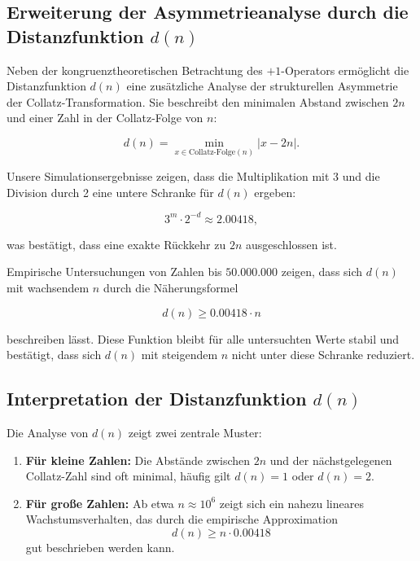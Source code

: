 \documentclass[a4paper,12pt]{article}
\begin{document}
\subsection{Erweiterung der Asymmetrieanalyse durch die Distanzfunktion \( d(n) \)}

Neben der kongruenztheoretischen Betrachtung des \(+1\)-Operators ermöglicht die Distanzfunktion \( d(n) \) eine zusätzliche Analyse der strukturellen Asymmetrie der Collatz-Transformation. Sie beschreibt den minimalen Abstand zwischen \( 2n \) und einer Zahl in der Collatz-Folge von \( n \):

\begin{equation}
    d(n) = \min_{x \in \text{Collatz-Folge}(n)} |x - 2n|.
\end{equation}

Unsere Simulationsergebnisse zeigen, dass die Multiplikation mit 3 und die Division durch 2 eine untere Schranke für \( d(n) \) ergeben:

\begin{equation}
    3^m \cdot 2^{-d} \approx 2.00418,
\end{equation}

was bestätigt, dass eine exakte Rückkehr zu \( 2n \) ausgeschlossen ist.

Empirische Untersuchungen von Zahlen bis \( 50.000.000 \) zeigen, dass sich \( d(n) \) mit wachsendem \( n \) durch die Näherungsformel

\begin{equation}
    d(n) \geq 0.00418 \cdot n
\end{equation}

beschreiben lässt. Diese Funktion bleibt für alle untersuchten Werte stabil und bestätigt, dass sich \( d(n) \) mit steigendem \( n \) nicht unter diese Schranke reduziert.



\subsection{Interpretation der Distanzfunktion \( d(n) \)}

Die Analyse von \( d(n) \) zeigt zwei zentrale Muster:

\begin{enumerate}
    \item \textbf{Für kleine Zahlen:} Die Abstände zwischen \( 2n \) und der nächstgelegenen Collatz-Zahl sind oft minimal, häufig gilt \( d(n) = 1 \) oder \( d(n) = 2 \).
    \item \textbf{Für große Zahlen:} Ab etwa \( n \approx 10^6 \) zeigt sich ein nahezu lineares Wachstumsverhalten, das durch die empirische Approximation 
    \[
    d(n) \geq n \cdot 0.00418
    \]
    gut beschrieben werden kann.
\end{enumerate}
\end{document}
